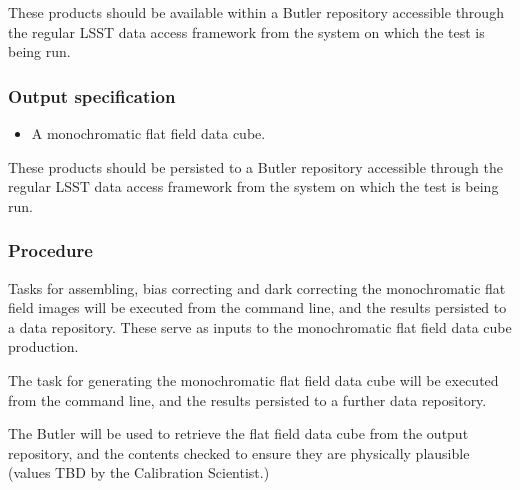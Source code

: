 These products should be available within a Butler repository accessible
through the regular LSST data access framework from the system on which the test
is being run.

\subsubsection{Output specification}

\begin{itemize}

  \item{A monochromatic flat field data cube.}

\end{itemize}

These products should be persisted to a Butler repository accessible through
the regular LSST data access framework from the system on which the test is
being run.

\subsubsection{Procedure}

Tasks for assembling, bias correcting and dark correcting the monochromatic
flat field images will be executed from the command line, and the results
persisted to a data repository. These serve as inputs to the monochromatic flat
field data cube production.

The task for generating the monochromatic flat field data cube will be executed
from the command line, and the results persisted to a further data repository.

The Butler will be used to retrieve the flat field data cube from the output
repository, and the contents checked to ensure they are physically plausible
(values TBD by the Calibration Scientist.)
